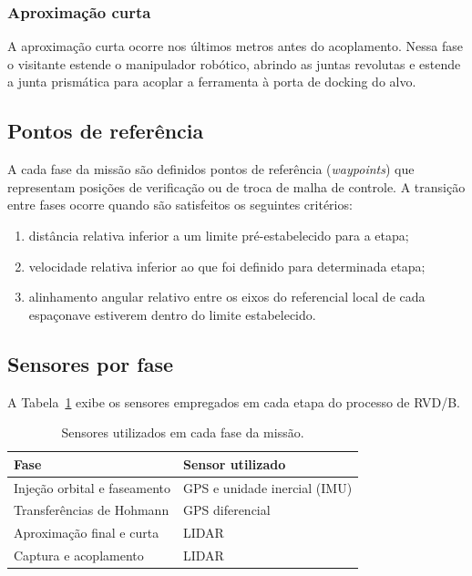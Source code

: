 \subsubsection{Aproximação curta}
\label{sec:aproximacao_curta}

A aproximação curta ocorre nos últimos metros antes do acoplamento.
Nessa fase o visitante estende o manipulador robótico, abrindo as juntas revolutas e estende a junta prismática para acoplar a ferramenta à porta de docking do alvo.

\subsection{Pontos de referência}  

A cada fase da missão são definidos pontos de referência (\textit{waypoints}) que representam posições de verificação ou de troca de malha de controle.
A transição entre fases ocorre quando são satisfeitos os seguintes critérios:
  
\begin{enumerate}[label=(\roman*)]
\item distância relativa inferior a um limite pré-estabelecido para a etapa;
\item velocidade relativa inferior ao que foi definido para determinada etapa;
\item alinhamento angular relativo entre os eixos do referencial local de cada espaçonave estiverem dentro do limite estabelecido.
\end{enumerate}

\subsection{Sensores por fase}  
A Tabela~\ref{tab:sensores_fases} exibe os sensores empregados em cada etapa do processo de RVD/B.

\begin{table}[ht]
\centering
\caption{Sensores utilizados em cada fase da missão.}
\label{tab:sensores_fases}
\begin{tabular}{p{7cm} p{8cm}}
\toprule
\textbf{Fase} & \textbf{Sensor utilizado} \\
\midrule
Injeção orbital e faseamento& GPS e unidade inercial (IMU)\\
Transferências de Hohmann& GPS diferencial\\
Aproximação final e curta& LIDAR\\
Captura e acoplamento& LIDAR\\
\bottomrule
\end{tabular}
\end{table}

